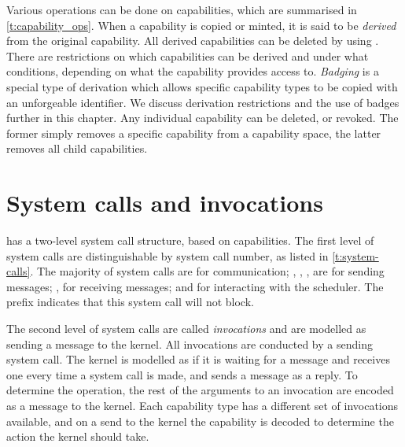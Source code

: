 Various operations can be done on capabilities, which are summarised in \cref{t:capability_ops}.
When a capability is copied or minted, it is said to be \emph{derived} from the original capability.
All derived capabilities can be deleted by using .
There are restrictions on which capabilities can be derived and under what conditions, depending on
what the capability provides access to. 
\emph{Badging} is a special type of derivation which allows specific capability types to be copied
with an unforgeable identifier. We discuss derivation restrictions and the use of badges further
in this chapter.
Any individual capability can be deleted, or revoked. The former simply removes a specific
capability from a capability space, the latter removes all child capabilities.

\section{System calls and invocations}

\selfour has a two-level system call structure, based on capabilities. The first level of system calls
are distinguishable by system call number, as listed in \cref{t:system-calls}. The majority of
system calls are for communication; , , ,  are for
sending messages; ,  for receiving messages; and  for
interacting with the scheduler. The  prefix indicates that this system call will not block.

The second level of system calls are called \emph{invocations} and are modelled as sending a message
to the kernel. All invocations are conducted by a sending system call. The kernel is modelled as if
it is waiting for a message and receives one every time a system call is made, and sends a message
as a reply. 
To determine the operation, the rest of the arguments to an invocation are encoded as a message to
the kernel. Each capability type has a different set of invocations available, and on a send to the
kernel the capability is decoded to determine the action the kernel should take. 

